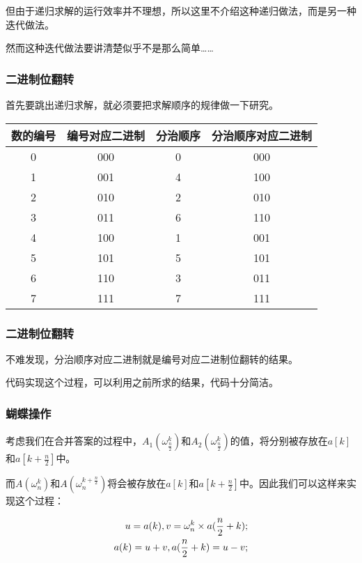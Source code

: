 \documentclass[10pt]{beamer}
\begin{document}
\begin{spacing}{1.2}
\begin{frame}
			但由于递归求解的运行效率并不理想，所以这里不介绍这种递归做法，而是另一种迭代做法。 \pause

			然而这种迭代做法要讲清楚似乎不是那么简单……
		\end{frame}

		\begin{frame}
			\frametitle{二进制位翻转}

			首先要跳出递归求解，就必须要把求解顺序的规律做一下研究。 \pause
			\begin{center}
				\begin{tabular}{c|c|c|c}
					数的编号 & 编号对应二进制 & 分治顺序 & 分治顺序对应二进制 \\
					\hline
					0 & 000 & 0 & 000 \\
					\hline
					1 & 001 & 4 & 100 \\
					\hline
					2 & 010 & 2 & 010 \\
					\hline
					3 & 011 & 6 & 110 \\
					\hline
					4 & 100 & 1 & 001 \\
					\hline
					5 & 101 & 5 & 101 \\
					\hline
					6 & 110 & 3 & 011 \\
					\hline
					7 & 111 & 7 & 111 \\
				\end{tabular}
			\end{center}
		\end{frame}
		\begin{frame}
			\frametitle{二进制位翻转}

			不难发现，分治顺序对应二进制就是编号对应二进制位翻转的结果。 \pause

			代码实现这个过程，可以利用之前所求的结果，代码十分简洁。
		\end{frame}

		\begin{frame}
			\frametitle{蝴蝶操作}

			考虑我们在合并答案的过程中，$A_1(\omega_{\frac{n}{2}}^k)$和$A_2(\omega_{\frac{n}{2}}^k)$的值，将分别被存放在$a[k]$和$a[k+\frac{n}{2}]$中。 \pause

			而$A(\omega_n^k)$和$A(\omega_n^{k+\frac{n}{2}})$将会被存放在$a[k]$和$a[k+\frac{n}{2}]$中。因此我们可以这样来实现这个过程： \pause

			\begin{align}
				u=a(k),v=\omega_n^k \times a(\frac{n}{2}+k); \notag \\
				a(k)=u+v,a(\frac{n}{2}+k)=u-v; \notag
			\end{align}
		\end{frame}


\end{spacing}
\end{document}
